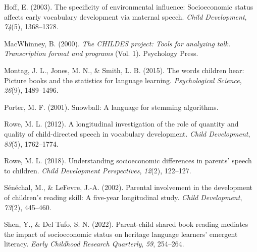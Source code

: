 \documentclass[10pt, letterpaper]{article}
\newenvironment{CSLReferences}%
  {}%
  {\par}
\begin{document}
\begin{CSLReferences}{1}{0}
\leavevmode{}%
Hoff, E. (2003). The specificity of environmental influence:
Socioeconomic status affects early vocabulary development via maternal
speech. \emph{Child Development}, \emph{74}(5), 1368--1378.

\leavevmode{}%
MacWhinney, B. (2000). \emph{The CHILDES project: Tools for analyzing
talk. Transcription format and programs} (Vol. 1). Psychology Press.

\leavevmode{}%
Montag, J. L., Jones, M. N., \& Smith, L. B. (2015). The words children
hear: Picture books and the statistics for language learning.
\emph{Psychological Science}, \emph{26}(9), 1489--1496.

\leavevmode{}%
Porter, M. F. (2001). Snowball: A language for stemming algorithms.

\leavevmode{}%
Rowe, M. L. (2012). A longitudinal investigation of the role of quantity
and quality of child-directed speech in vocabulary development.
\emph{Child Development}, \emph{83}(5), 1762--1774.

\leavevmode{}%
Rowe, M. L. (2018). Understanding socioeconomic differences in parents'
speech to children. \emph{Child Development Perspectives}, \emph{12}(2),
122--127.

\leavevmode{}%
Sénéchal, M., \& LeFevre, J.-A. (2002). Parental involvement in the
development of children's reading skill: A five-year longitudinal study.
\emph{Child Development}, \emph{73}(2), 445--460.

\leavevmode{}%
Shen, Y., \& Del Tufo, S. N. (2022). Parent-child shared book reading
mediates the impact of socioeconomic status on heritage language
learners' emergent literacy. \emph{Early Childhood Research Quarterly},
\emph{59}, 254--264.

\end{CSLReferences}


\end{document}
